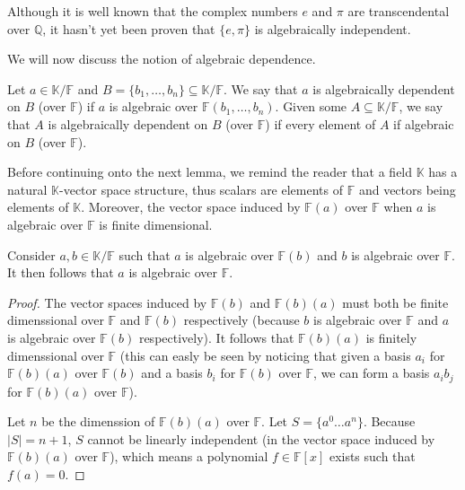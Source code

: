 Although it is well known that the complex numbers $e$ and $\pi$ are transcendental over $\mathbb{Q}$, it hasn't yet been proven that $\{e, \pi \}$ is algebraically independent.

We will now discuss the notion of algebraic dependence.

\begin{defn}
	Let $a \in \mathbb K / \mathbb F$ and $B = \{b _1, \ldots, b _n \} \subseteq  \mathbb K / \mathbb F$. We say that $a$ is algebraically dependent on $B$ (over $ \mathbb{F} $) if $a$ is algebraic over $\mathbb F(b _1, \ldots, b _n )$. Given some $A \subseteq  \mathbb K / \mathbb{F} $, we say that $A$ is algebraically dependent on $B$ (over $\mathbb{F} $) if every element of $A$ if algebraic on $B$ (over $\mathbb{F} $).
\end{defn}

Before continuing onto the next lemma, we remind the reader that a field $\mathbb{K}$ has a natural $\mathbb{K}$-vector space structure, thus scalars are elements of $\mathbb{F} $ and vectors being elements of $\mathbb K$. Moreover, the vector space induced by $\mathbb{F} (a)$ over $\mathbb{F} $ when $a$ is algebraic over $\mathbb{F} $ is finite dimensional.

\begin{lemma}\label{lem:algebraic-transitivity}
	Consider $a, b \in \mathbb K / \mathbb{F} $ such that $a$ is algebraic over $\mathbb{F}(b) $ and $b$ is algebraic over $\mathbb{F}$. It then follows that $a$ is algebraic over $\mathbb{F}$.
\end{lemma}

\begin{proof}
	The vector spaces induced by $\mathbb{F} (b)$ and $\mathbb{F} (b)(a)$ must both be finite dimenssional over $\mathbb{F} $ and $\mathbb{F} (b)$ respectively (because $b$ is algebraic over $\mathbb{F} $ and $a$ is algebraic over $\mathbb{F} (b)$ respectively). It follows that $\mathbb{F} (b)(a)$ is finitely dimenssional over $\mathbb{F}$ (this can easly be seen by noticing that given a basis $a _i $ for $\mathbb{F} (b)(a)$ over $\mathbb{F} (b)$ and a basis $b _i $ for $\mathbb{F} (b)$ over $\mathbb{F} $, we can form a basis $a _i b _j $ for $\mathbb{F} (b)(a)$ over $\mathbb{F} $).

	Let $n$ be the dimenssion of $\mathbb{F} (b)(a)$ over $\mathbb{F} $. Let $S = \{a ^0 \ldots a ^n \}$. Because $|S| = n + 1$, $S$ cannot be linearly independent (in the vector space induced by $\mathbb{F} (b)(a)$ over $\mathbb{F} $), which means a polynomial $f \in \mathbb{F} [x]$ exists such that $f(a) = 0$.
\end{proof}

